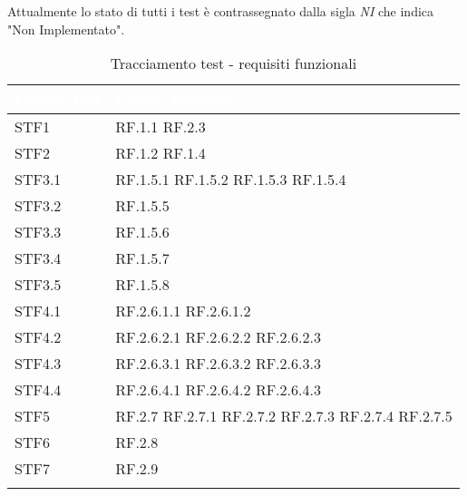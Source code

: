     Attualmente lo stato di tutti i test è contrassegnato dalla sigla \textit{NI} che indica "Non Implementato".
\begin{center}
    \renewcommand\arraystretch{1.5}
    \centering
    \begin{longtable}{|p{3cm}|p{10cm}|} \hline
        \rowcolor[HTML]{036400}
        \textcolor{white}{\textbf{Codice Test}} & \textcolor{white}{\textbf{Codice Requisiti}} \\ \hline
        \rowcolor[HTML]{EFEFEF}
        STF1 & RF.1.1 RF.2.3\\ \hline
        \rowcolor[HTML]{C0C0C0}
        STF2 & RF.1.2 RF.1.4 \\ \hline
        \rowcolor[HTML]{EFEFEF}
        STF3.1 & RF.1.5.1 RF.1.5.2 RF.1.5.3 RF.1.5.4 \\ \hline
        \rowcolor[HTML]{C0C0C0}
        STF3.2 & RF.1.5.5 \\ \hline
        \rowcolor[HTML]{EFEFEF}
        STF3.3 & RF.1.5.6 \\ \hline
        \rowcolor[HTML]{C0C0C0}
        STF3.4 & RF.1.5.7 \\ \hline
        \rowcolor[HTML]{EFEFEF}
        STF3.5 & RF.1.5.8 \\ \hline
        \rowcolor[HTML]{C0C0C0}
        STF4.1 & RF.2.6.1.1 RF.2.6.1.2\\ \hline
        \rowcolor[HTML]{EFEFEF}
        STF4.2 & RF.2.6.2.1 RF.2.6.2.2 RF.2.6.2.3\\ \hline
        \rowcolor[HTML]{C0C0C0}
        STF4.3 & RF.2.6.3.1 RF.2.6.3.2 RF.2.6.3.3\\ \hline
        \rowcolor[HTML]{EFEFEF}
        STF4.4 & RF.2.6.4.1 RF.2.6.4.2 RF.2.6.4.3\\ \hline
        \rowcolor[HTML]{C0C0C0}
        STF5 & RF.2.7 RF.2.7.1 RF.2.7.2 RF.2.7.3 RF.2.7.4 RF.2.7.5 \\ \hline
        \rowcolor[HTML]{EFEFEF}
        STF6 & RF.2.8 \\ \hline
        \rowcolor[HTML]{C0C0C0}
        STF7 & RF.2.9 \\ \hline
        \caption{Tracciamento test - requisiti funzionali}
    \end{longtable}
\end{center}
